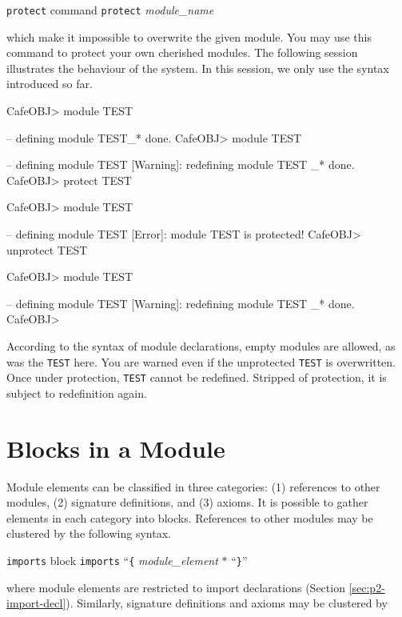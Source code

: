 \documentclass[a4paper]{memoir}
\begin{document}
\begin{bsyntax} \texttt{protect} command  \Hline
\texttt{protect} \textit{module\_name}
\end{bsyntax}

which make it impossible to overwrite the given module. You may use
this command to protect your own cherished modules.
The following session illustrates the behaviour of the system.
In this session, we only use the syntax introduced so far.
\begin{vvtm}
\begin{ccode}
  CafeOBJ> module TEST { }

  -- defining module TEST_* done.
  CafeOBJ> module TEST { }

  -- defining module TEST
  [Warning]: redefining module TEST _* done.
  CafeOBJ> protect TEST

  CafeOBJ> module TEST { }

  -- defining module TEST
  [Error]: module TEST is protected!
  CafeOBJ> unprotect TEST

  CafeOBJ> module TEST { }

  -- defining module TEST
  [Warning]: redefining module TEST _* done.
  CafeOBJ> 
\end{ccode}
\end{vvtm}
According to the syntax of module declarations, empty modules
are allowed, as was the \verb|TEST| here.
You are warned even if the unprotected \verb|TEST| is overwritten.
Once under protection, \verb|TEST| cannot be redefined. Stripped
of protection, it is subject to redefinition again.

\section{Blocks in a Module}\label{sec:p2-blocks-in-mod}

Module elements can be classified in three categories: (1) references
to other modules, (2) signature definitions,
and (3) axioms.
It is possible to gather elements in each category into blocks.
References to other modules may be clustered by the following syntax.

\begin{bsyntax} \texttt{imports} block  \Hline
\texttt{imports} ``\texttt{\{} \textit{module\_element} $*$ ``\texttt{\}}''
\end{bsyntax}

where module elements are restricted to import declarations
(Section \ref{sec:p2-import-decl}). Similarly, signature definitions
and axioms may be clustered by
\end{document}
